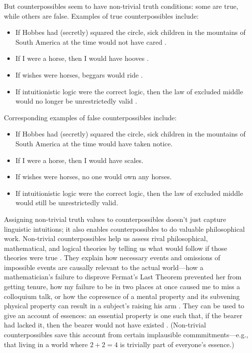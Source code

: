 But counterpossibles seem to have non-trivial truth conditions: some are true, while others are false.  Examples of true counterpossibles include:
\begin{itemize}
\item[] If Hobbes had (secretly) squared the circle, sick children in the mountains of South America at the time would not have cared \citep[544]{Nolan1997-DANIWA}.
\item[] If I were a horse, then I would have hooves \citep[10]{Krakauer2012-KRAC-2}.
\item[] If wishes were horses, beggars would ride \citep[10]{Krakauer2012-KRAC-2}.
\item[] If intuitionistic logic were the correct logic, then the law of excluded middle would no longer be unrestrictedly valid \citep[adapted from][]{Brogaard2013-BROROC-3}.
\end{itemize}
Corresponding examples of false counterpossibles include:
\begin{itemize}
\item[] If Hobbes had (secretly) squared the circle, sick children in the mountains of South America at the time would have taken notice.
\item[] If I were a horse, then I would have scales.
\item[] If wishes were horses, no one would own any horses.
\item[] If intuitionistic logic were the correct logic, then the law of excluded middle would still be unrestrictedly valid.
\end{itemize}

Assigning non-trivial truth values to counterpossibles doesn't just capture linguistic intuitions; it also enables counterpossibles to do valuable philosophical work.  Non-trivial counterpossibles help us assess rival philosophical, mathematical, and logical theories by telling us what would follow if those theories were true \citep{Krakauer2012-KRAC-2, Brogaard2013-BROROC-3, Nolan1997-DANIWA}.   They explain how necessary events and omissions of impossible events are causally relevant to the actual world---how a mathematician's failure to disprove Fermat's Last Theorem prevented her from getting tenure, how my failure to be in two places at once caused me to miss a colloquium talk, or how the copresence of a mental property and its subvening physical property can result in a subject's raising his arm \citep{BernsteinForthcoming-BEROI-3}.  They can be used to give an account of essences: an essential property is one such that, if the bearer had lacked it, then the bearer would not have existed \citep{Brogaard2013-BROROC-3, BrogaardForthcoming-BROACA-2}.  (Non-trivial counterpossibles save this account from certain implausible commmitments---e.g., that living in a world where $2+2=4$ is trivially part of everyone's essence.)

